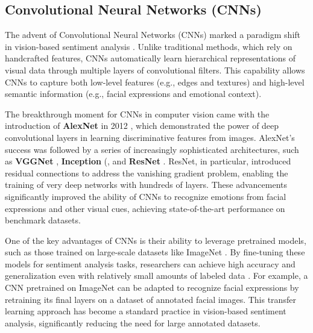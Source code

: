 \subsection*{Convolutional Neural Networks (CNNs)}

The advent of Convolutional Neural Networks (CNNs) marked a paradigm shift in vision-based sentiment analysis \cite{lecun_deep_2015}. Unlike traditional methods, which rely on handcrafted features, CNNs automatically learn hierarchical representations of visual data through multiple layers of convolutional filters. This capability allows CNNs to capture both low-level features (e.g., edges and textures) and high-level semantic information (e.g., facial expressions and emotional context).
\newline

The breakthrough moment for CNNs in computer vision came with the introduction of \textbf{AlexNet} in 2012 \cite{10.5555/2999134.2999257}, which demonstrated the power of deep convolutional layers in learning discriminative features from images. AlexNet's success was followed by a series of increasingly sophisticated architectures, such as \textbf{VGGNet} \cite{simonyan2015deepconvolutionalnetworkslargescale}, \textbf{Inception} (\cite{szegedy2015rethinkinginceptionarchitecturecomputer}, and \textbf{ResNet} \cite{he2015deepresiduallearningimage}. ResNet, in particular, introduced residual connections to address the vanishing gradient problem, enabling the training of very deep networks with hundreds of layers. These advancements significantly improved the ability of CNNs to recognize emotions from facial expressions and other visual cues, achieving state-of-the-art performance on benchmark datasets.
\newline

One of the key advantages of CNNs is their ability to leverage pretrained models, such as those trained on large-scale datasets like ImageNet \cite{5206848}. By fine-tuning these models for sentiment analysis tasks, researchers can achieve high accuracy and generalization even with relatively small amounts of labeled data \cite{yosinski2014transferablefeaturesdeepneural}. For example, a CNN pretrained on ImageNet can be adapted to recognize facial expressions by retraining its final layers on a dataset of annotated facial images. This transfer learning approach has become a standard practice in vision-based sentiment analysis, significantly reducing the need for large annotated datasets.
\newline

